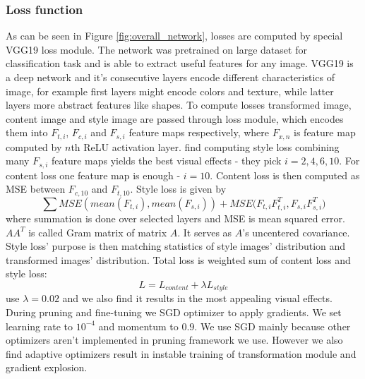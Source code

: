 \documentclass[../Main.tex]{subfiles}
\begin{document}
    \subsubsection{Loss function}
    As can be seen in Figure \ref{fig:overall_network}, losses are computed by
    special VGG19 loss module. The network was pretrained on large dataset for classification
    task and is able to extract useful features for any image. 
    VGG19 is a deep network and it's consecutive
    layers encode different characteristics of image, for example first layers might
    encode colors and texture, while latter layers more abstract features like shapes.
    To compute losses transformed image, content image and
    style image are passed through loss module, which encodes them into $F_{t,i}$, $F_{c,i}$ and 
    $F_{s,i}$ feature maps respectively, where $F_{x,n}$ is feature map computed by $n$th
    ReLU activation layer. \cite{Li2018} find computing style loss combining many $F_{s,i}$
    feature maps yields the best visual effects - they pick $i=2,4,6,10$. For 
    content loss one feature map is enough - $i=10$. Content loss is then computed as 
    MSE between $F_{c,10}$ and $F_{t,10}$. Style loss is given by 
    \[ \sum{MSE(mean(F_{t,i}), mean(F_{s,i})) + MSE(F_{t,i}F_{t,i}^T, F_{s,i}F_{s,i}^T}) \]
    where summation is done over selected layers and MSE is mean squared error.
    $AA^T$ is called Gram matrix of matrix $A$. It serves as $A$'s uncentered covariance.
    Style loss' purpose is then matching statistics of
    style images' distribution and transformed images' distribution.
    Total loss is weighted sum of content loss and style loss:
    \[L=L_{content} + \lambda L_{style}\] \cite{Li2018} use $\lambda=0.02$ and we 
    also find it results in the most appealing visual effects. During pruning and 
    fine-tuning we SGD optimizer to apply gradients. We set learning rate to $10^{-4}$
    and momentum to $0.9$. We use SGD mainly because other optimizers aren't implemented 
    in pruning framework we use. However we also find adaptive optimizers result 
    in instable training of transformation module and gradient explosion.
    
\end{document}
